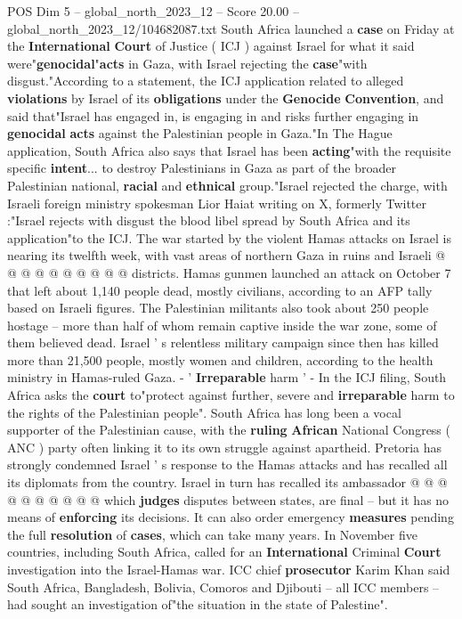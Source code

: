 \begin{textsample}{POS Dim 5 – global\_north\_2023\_12 – Score 20.00 – global\_north\_2023\_12/104682087.txt}  \label{ex:f5_pos_341}
South Africa launched a \textbf{case} on Friday at the \textbf{International} \textbf{Court} of Justice ( ICJ ) against Israel for what it said were"\textbf{genocidal}"\textbf{acts} in Gaza, with Israel rejecting the \textbf{case}"with disgust."According to a statement, the ICJ application related to alleged \textbf{violations} by Israel of its \textbf{obligations} under the \textbf{Genocide} \textbf{Convention}, and said that"Israel has engaged in, is engaging in and risks further engaging in \textbf{genocidal} \textbf{acts} against the Palestinian people in Gaza."In The Hague application, South Africa also says that Israel has been \textbf{acting}"with the requisite specific \textbf{intent}... to destroy Palestinians in Gaza as part of the broader Palestinian national, \textbf{racial} and \textbf{ethnical} group."Israel rejected the charge, with Israeli foreign ministry spokesman Lior Haiat writing on X, formerly Twitter :"Israel rejects with disgust the blood libel spread by South Africa and its application"to the ICJ.
The war started by the violent Hamas attacks on Israel is nearing its twelfth week, with vast areas of northern Gaza in ruins and Israeli @ @ @ @ @ @ @ @ @ @ districts.
Hamas gunmen launched an attack on October 7 that left about 1,140 people dead, mostly civilians, according to an AFP tally based on Israeli figures.
The Palestinian militants also took about 250 people hostage -- more than half of whom remain captive inside the war zone, some of them believed dead.
Israel ' s relentless military campaign since then has killed more than 21,500 people, mostly women and children, according to the health ministry in Hamas-ruled Gaza. - ' \textbf{Irreparable} harm ' - In the ICJ filing, South Africa asks the \textbf{court} to"protect against further, severe and \textbf{irreparable} harm to the rights of the Palestinian people".
South Africa has long been a vocal supporter of the Palestinian cause, with the \textbf{ruling} \textbf{African} National Congress ( ANC ) party often linking it to its own struggle against apartheid.
Pretoria has strongly condemned Israel ' s response to the Hamas attacks and has recalled all its diplomats from the country.
Israel in turn has recalled its ambassador @ @ @ @ @ @ @ @ @ @ which \textbf{judges} disputes between states, are final -- but it has no means of \textbf{enforcing} its decisions.
It can also order emergency \textbf{measures} pending the full \textbf{resolution} of \textbf{cases}, which can take many years.
In November five countries, including South Africa, called for an \textbf{International} Criminal \textbf{Court} investigation into the Israel-Hamas war.
ICC chief \textbf{prosecutor} Karim Khan said South Africa, Bangladesh, Bolivia, Comoros and Djibouti -- all ICC members -- had sought an investigation of"the situation in the state of Palestine".

\end{textsample}
